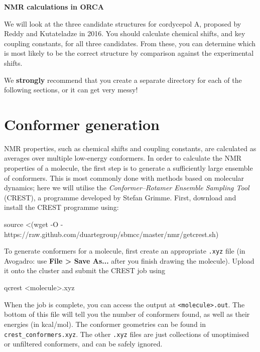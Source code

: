 \documentclass[10pt]{article}
\begin{document}

\textbf{\LARGE NMR calculations in ORCA}

\vspace{0.5cm}

We will look at the three candidate structures for cordycepol A, proposed by Reddy and Kutateladze in 2016.\autocite{Reddy2016} You should calculate chemical shifts, and key coupling constants, for all three candidates. From these, you can determine which is most likely to be the correct structure by comparison against the experimental shifts.

\begin{warning}
We \textbf{strongly} recommend that you create a separate directory for each of the following sections, or it can get very messy!
\end{warning}

\section{Conformer generation}

NMR properties, such as chemical shifts and coupling constants, are calculated as averages over multiple low-energy conformers. In order to calculate the NMR properties of a molecule, the first step is to generate a sufficiently large ensemble of conformers. This is most commonly done with methods based on molecular dynamics; here we will utilise the \textit{Conformer--Rotamer Ensemble Sampling Tool} (CREST), a programme developed by Stefan Grimme.\autocite{Bannwarth2019, Grimme2019} First, download and install the CREST programme using:

\begin{cmdline}
source <(wget -O - https://raw.github.com/duartegroup/sbmcc/master/nmr/getcrest.sh)
\end{cmdline}

To generate conformers for a molecule, first create an appropriate \texttt{.xyz} file (in Avogadro: use \textbf{File > Save As...} after you finish drawing the molecule). Upload it onto the cluster and submit the CREST job using

\begin{cmdline}
qcrest <molecule>.xyz
\end{cmdline}

When the job is complete, you can access the output at \texttt{<molecule>.out}. The bottom of this file will tell you the number of conformers found, as well as their energies (in kcal/mol). The conformer geometries can be found in \texttt{crest\_conformers.xyz}. The other \texttt{.xyz} files are just collections of unoptimised or unfiltered conformers, and can be safely ignored.
\end{document}
